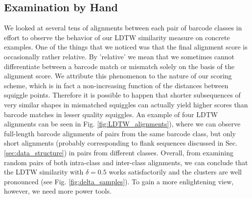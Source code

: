 \subsection{Examination by Hand}
We looked at several tens of alignments between each pair of barcode classes in effort to observe the behavior of our LDTW similarity measure on concrete examples. One of the things that we noticed was that the final alignment score is occasionally rather relative. By 'relative' we mean that we sometimes cannot differentiate between a barcode match or mismatch solely on the basis of the alignment score. We attribute this phenomenon to the nature of our scoring scheme, which is in fact a non-increasing function of the distances between squiggle points. Therefore it is possible to happen that shorter subsequences of very similar shapes in mismatched squiggles can actually yield higher scores than barcode matches in lesser quality squiggles. An example of four LDTW alignments can be seen in Fig. \ref{fig:LDTW_alignments}), where we can observe full-length barcode alignments of pairs from the same barcode class, but only short alignments (probably corresponding to flank sequences discussed in Sec. \ref{sec:data_structure}) in pairs from different classes. Overall, from examining random pairs of both intra-class and inter-class alignments, we can conclude that the LDTW similarity with $\delta = 0.5$ works satisfactorily and the clusters are well pronounced (see Fig. \ref{fig:delta_samples}). To gain a more enlightening view, however, we need more power tools.

